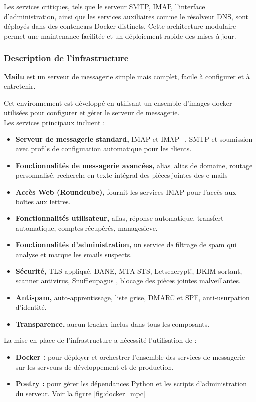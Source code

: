 Les services critiques, tels que le serveur SMTP, IMAP, l'interface d'administration, ainsi que les services auxiliaires comme le résolveur DNS, sont déployés dans des conteneurs Docker distincts. Cette architecture modulaire permet une maintenance facilitée et un déploiement rapide des mises à jour.

\subsubsection{Description de l'infrastructure}

\textbf{Mailu} est un serveur de messagerie simple mais complet, facile à configurer et à entretenir.

Cet environnement est développé en utilisant un ensemble d'images docker utilisées pour configurer et gérer le serveur de messagerie.\\

\noindent Les services principaux incluent :
\begin{itemize}
	\item \textbf{Serveur de messagerie standard,} IMAP et IMAP+, SMTP et soumission avec profils de configuration automatique pour les clients.
	\item \textbf{Fonctionnalités de messagerie avancées,} alias, alias de domaine, routage personnalisé, recherche en texte intégral des pièces jointes des e-mails
	\item \textbf{Accès Web (Roundcube),} fournit les services IMAP pour l'accès aux boîtes aux lettres.
	\item \textbf{Fonctionnalités utilisateur,} alias, réponse automatique, transfert automatique, comptes récupérés, managesieve.
	\item \textbf{Fonctionnalités d'administration,} un service de filtrage de spam qui analyse et marque les emails suspects.
	\item \textbf{Sécurité,} TLS appliqué, DANE, MTA-STS, Letsencrypt!, DKIM sortant, scanner antivirus, Snuffleupagus , blocage des pièces jointes malveillantes.
	\item \textbf{Antispam,} auto-apprentissage, liste grise, DMARC et SPF, anti-usurpation d'identité.
	\item \textbf{Transparence,} aucun tracker inclus dans tous les composants.
\end{itemize}


\noindent La mise en place de l'infrastructure a nécessité l'utilisation de :
\begin{itemize}
	\item \textbf{Docker :}  pour déployer et orchestrer l'ensemble des services de messagerie sur les serveurs de développement et de production.
	\item \textbf{Poetry :}  pour gérer les dépendances Python et les scripts d'administration du serveur. Voir la figure \ref{fig:docker_mpc}
\end{itemize}

